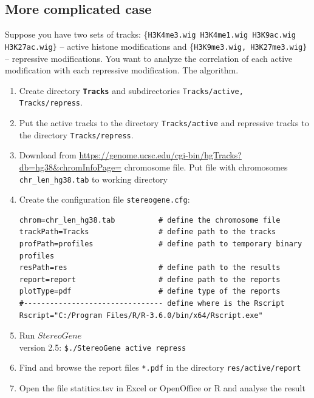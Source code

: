 \documentclass{article}
\newcommand{\prm}[1]{\texttt{\textbf{{#1}}}}
\newcommand{\pr}[1]{\texttt{{#1}}}
\newcommand{\sg}{$StereoGene$\\ version 2.5}
\begin{document}
\subsection{More complicated case}\label{case2}
Suppose you have two sets of tracks: \{\pr{H3K4me3.wig H3K4me1.wig H3K9ac.wig H3K27ac.wig\}} -- active histone modifications and \{\pr{H3K9me3.wig, H3K27me3.wig\}} -- repressive modifications. You want to analyze the correlation of each active modification with each repressive modification. The algorithm.
\begin{enumerate}
\item Create directory \prm{Tracks} and subdirectories \pr{Tracks/active, Tracks/repress}.
\item Put the active tracks to the directory \pr{Tracks/active} and repressive tracks to the directory \pr{Tracks/repress}.
\item Download from \url{https://genome.ucsc.edu/cgi-bin/hgTracks?db=hg38&chromInfoPage=} chromosome file. Put file with chromosomes \pr{chr\_len\_hg38.tab} to working directory
\item Create the configuration file \pr{stereogene.cfg}:

\begin{shaded} 
\begin{verbatim}
chrom=chr_len_hg38.tab          # define the chromosome file
trackPath=Tracks                # define path to the tracks
profPath=profiles               # define path to temporary binary profiles
resPath=res                     # define path to the results
report=report                   # define path to the reports
plotType=pdf                    # define type of the reports
#-------------------------------- define where is the Rscript 
Rscript="C:/Program Files/R/R-3.6.0/bin/x64/Rscript.exe"
\end{verbatim}
\end{shaded}


\item Run \sg: 
\pr{\$./StereoGene active repress}
\item Find and browse the report files \pr{*.pdf} in the directory \pr{res/active/report}
\item Open the file statitics.tsv in Excel or OpenOffice or R and analyse the result
\end{enumerate}
\end{document}
